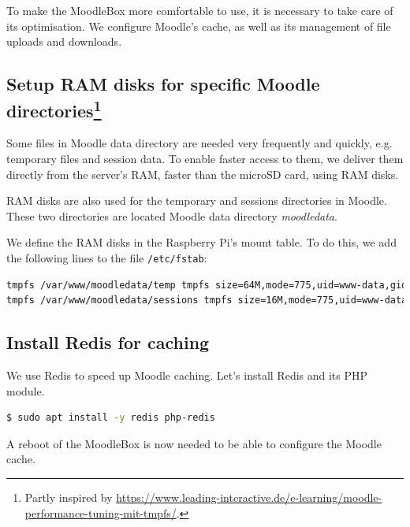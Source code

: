 \documentclass[12pt]{article}
\begin{document}
To make the MoodleBox more comfortable to use, it is necessary to take care of its optimisation.
We configure Moodle's cache, as well as its management of file uploads and downloads.

\subsection[Setup RAM disks for specific Moodle directories]{Setup RAM disks for specific Moodle directories\footnote{Partly inspired by \url{https://www.leading-interactive.de/e-learning/moodle-performance-tuning-mit-tmpfs/}.}}

Some files in Moodle data directory are needed very frequently and quickly, e.g. temporary files and session data.
To enable faster access to them, we deliver them directly from the server's RAM, faster than the microSD card, using RAM disks.

RAM disks are also used for the temporary and sessions directories in Moodle.
These two directories are located Moodle data directory \emph{moodledata}.

We define the RAM disks in the Raspberry Pi's mount table.
To do this, we add the following lines to the file \lstinline{/etc/fstab}:
\begin{lstlisting}[language=bash]
tmpfs /var/www/moodledata/temp tmpfs size=64M,mode=775,uid=www-data,gid=www-data 0 0
tmpfs /var/www/moodledata/sessions tmpfs size=16M,mode=775,uid=www-data,gid=www-data 0 0
\end{lstlisting}

%
%

\subsection{Install Redis for caching}

We use Redis to speed up Moodle caching.
Let's install Redis and its PHP module.

\begin{lstlisting}[language=bash]
$ sudo apt install -y redis php-redis
\end{lstlisting}

A reboot of the MoodleBox is now needed to be able to configure the Moodle cache.
\end{document}
